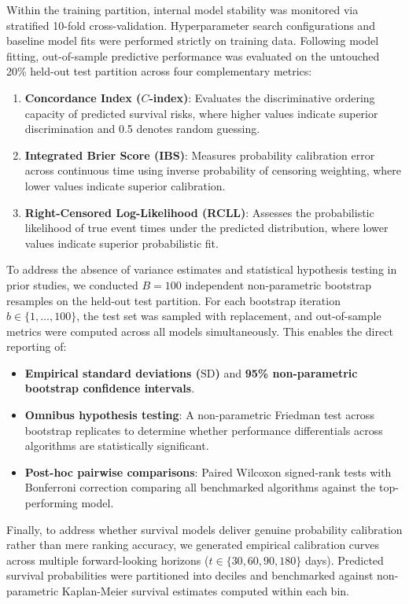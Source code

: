 \documentclass[pdflatex,iicol,sn-mathphys-ay]{sn-jnl}
\theoremstyle{thmstyleone}%
\theoremstyle{thmstyletwo}%
\theoremstyle{thmstylethree}%
\begin{document}
Within the training partition, internal model stability was monitored via stratified 10-fold cross-validation. Hyperparameter search configurations and baseline model fits were performed strictly on training data. Following model fitting, out-of-sample predictive performance was evaluated on the untouched 20\% held-out test partition across four complementary metrics:
\begin{enumerate}
  \item \textbf{Concordance Index ($C$-index)}: Evaluates the discriminative ordering capacity of predicted survival risks, where higher values indicate superior discrimination and 0.5 denotes random guessing.
  \item \textbf{Integrated Brier Score (IBS)}: Measures probability calibration error across continuous time using inverse probability of censoring weighting, where lower values indicate superior calibration.
  \item \textbf{Right-Censored Log-Likelihood (RCLL)}: Assesses the probabilistic likelihood of true event times under the predicted distribution, where lower values indicate superior probabilistic fit.
\end{enumerate}

To address the absence of variance estimates and statistical hypothesis testing in prior studies, we conducted $B = 100$ independent non-parametric bootstrap resamples on the held-out test partition. For each bootstrap iteration $b \in \{1, \dots, 100\}$, the test set was sampled with replacement, and out-of-sample metrics were computed across all models simultaneously. This enables the direct reporting of:
\begin{itemize}
  \item \textbf{Empirical standard deviations ($\text{SD}$)} and \textbf{95\% non-parametric bootstrap confidence intervals}.
  \item \textbf{Omnibus hypothesis testing}: A non-parametric Friedman test across bootstrap replicates to determine whether performance differentials across algorithms are statistically significant.
  \item \textbf{Post-hoc pairwise comparisons}: Paired Wilcoxon signed-rank tests with Bonferroni correction comparing all benchmarked algorithms against the top-performing model.
\end{itemize}

Finally, to address whether survival models deliver genuine probability calibration rather than mere ranking accuracy, we generated empirical calibration curves across multiple forward-looking horizons ($t \in \{30, 60, 90, 180\}$ days). Predicted survival probabilities were partitioned into deciles and benchmarked against non-parametric Kaplan-Meier survival estimates computed within each bin.
\end{document}
